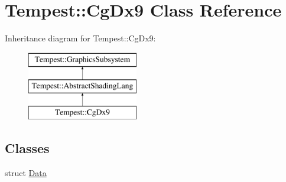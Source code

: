 \hypertarget{class_tempest_1_1_cg_dx9}{\section{Tempest\+:\+:Cg\+Dx9 Class Reference}
\label{class_tempest_1_1_cg_dx9}
}
Inheritance diagram for Tempest\+:\+:Cg\+Dx9\+:\begin{figure}[H]
\begin{center}
\leavevmode
\includegraphics[height=3.000000cm]{class_tempest_1_1_cg_dx9}
\end{center}
\end{figure}
\subsection*{Classes}
\begin{DoxyCompactItemize}
\item 
struct \hyperlink{struct_cg_dx9_1_1_data}{Data}
\end{DoxyCompactItemize}
